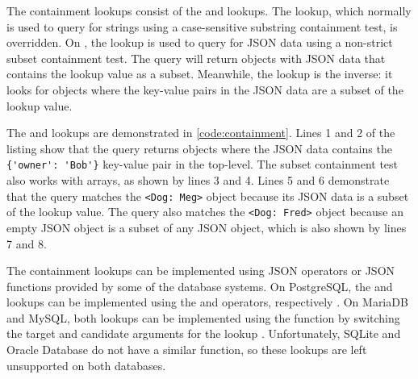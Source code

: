 \noindent
\begin{minipage}{\linewidth}

\end{minipage}

\noindent
\begin{minipage}{\linewidth}

\end{minipage}

The containment lookups consist of the  and 
lookups. The  lookup, which normally is used to query for
strings using a case-sensitive substring containment test, is overridden. On
, the lookup is used to query for JSON data using a non-strict
subset containment test. The query will return objects with JSON data that
contains the lookup value as a subset. Meanwhile, the 
lookup is the inverse: it looks for objects where the key-value pairs in the
JSON data are a subset of the lookup value.

The  and  lookups are demonstrated in
\autoref{code:containment}. Lines 1 and 2 of the listing show that the query
returns objects where the JSON data contains the \verb|{'owner': 'Bob'}|
key-value pair in the top-level. The subset containment test also works with
arrays, as shown by lines 3 and 4. Lines 5 and 6 demonstrate that the query
matches the \verb|<Dog: Meg>| object because its JSON data is a subset of the
lookup value. The query also matches the \verb|<Dog: Fred>| object because an
empty JSON object is a subset of any JSON object, which is also shown by lines
7 and 8.

The containment lookups can be implemented using JSON operators or JSON
functions provided by some of the database systems. On PostgreSQL, the
 and  lookups can be implemented using the
 and  operators, respectively \cite{postgres:json_operators}.
On MariaDB and MySQL, both lookups can be implemented using the
 function by switching the target and candidate arguments
for the  lookup \cite{mariadb:json_contains,
mysql:json_search}. Unfortunately, SQLite and Oracle Database do not have a
similar function, so these lookups are left unsupported on both databases.

